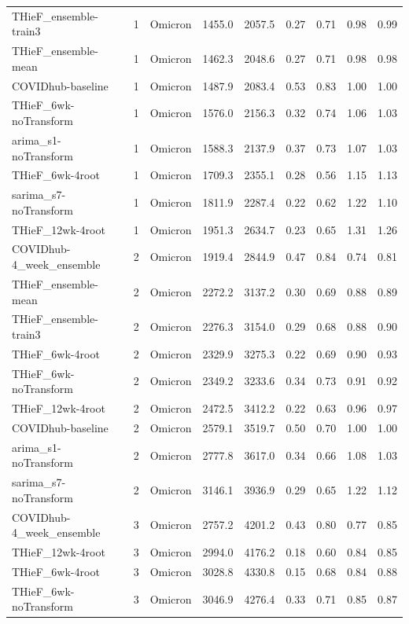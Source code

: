 \documentclass[thesis]{umassthesis}  %
\begin{document}
\begin{longtable}{lrlrrrrrr}
  THieF\_ensemble-train3 & 1 & Omicron & 1455.0 & 2057.5 & 0.27 & 0.71 & 0.98 & 0.99 \\ 
  THieF\_ensemble-mean & 1 & Omicron & 1462.3 & 2048.6 & 0.27 & 0.71 & 0.98 & 0.98 \\ 
  COVIDhub-baseline & 1 & Omicron & 1487.9 & 2083.4 & 0.53 & 0.83 & 1.00 & 1.00 \\ 
  THieF\_6wk-noTransform & 1 & Omicron & 1576.0 & 2156.3 & 0.32 & 0.74 & 1.06 & 1.03 \\ 
  arima\_s1-noTransform & 1 & Omicron & 1588.3 & 2137.9 & 0.37 & 0.73 & 1.07 & 1.03 \\ 
  THieF\_6wk-4root & 1 & Omicron & 1709.3 & 2355.1 & 0.28 & 0.56 & 1.15 & 1.13 \\ 
  sarima\_s7-noTransform & 1 & Omicron & 1811.9 & 2287.4 & 0.22 & 0.62 & 1.22 & 1.10 \\ 
  THieF\_12wk-4root & 1 & Omicron & 1951.3 & 2634.7 & 0.23 & 0.65 & 1.31 & 1.26 \\ 
  COVIDhub-4\_week\_ensemble & 2 & Omicron & 1919.4 & 2844.9 & 0.47 & 0.84 & 0.74 & 0.81 \\ 
  THieF\_ensemble-mean & 2 & Omicron & 2272.2 & 3137.2 & 0.30 & 0.69 & 0.88 & 0.89 \\ 
  THieF\_ensemble-train3 & 2 & Omicron & 2276.3 & 3154.0 & 0.29 & 0.68 & 0.88 & 0.90 \\ 
  THieF\_6wk-4root & 2 & Omicron & 2329.9 & 3275.3 & 0.22 & 0.69 & 0.90 & 0.93 \\ 
  THieF\_6wk-noTransform & 2 & Omicron & 2349.2 & 3233.6 & 0.34 & 0.73 & 0.91 & 0.92 \\ 
  THieF\_12wk-4root & 2 & Omicron & 2472.5 & 3412.2 & 0.22 & 0.63 & 0.96 & 0.97 \\ 
  COVIDhub-baseline & 2 & Omicron & 2579.1 & 3519.7 & 0.50 & 0.70 & 1.00 & 1.00 \\ 
  arima\_s1-noTransform & 2 & Omicron & 2777.8 & 3617.0 & 0.34 & 0.66 & 1.08 & 1.03 \\ 
  sarima\_s7-noTransform & 2 & Omicron & 3146.1 & 3936.9 & 0.29 & 0.65 & 1.22 & 1.12 \\ 
  COVIDhub-4\_week\_ensemble & 3 & Omicron & 2757.2 & 4201.2 & 0.43 & 0.80 & 0.77 & 0.85 \\ 
  THieF\_12wk-4root & 3 & Omicron & 2994.0 & 4176.2 & 0.18 & 0.60 & 0.84 & 0.85 \\ 
  THieF\_6wk-4root & 3 & Omicron & 3028.8 & 4330.8 & 0.15 & 0.68 & 0.84 & 0.88 \\ 
  THieF\_6wk-noTransform & 3 & Omicron & 3046.9 & 4276.4 & 0.33 & 0.71 & 0.85 & 0.87 \\ 

\end{longtable}
\end{document}
